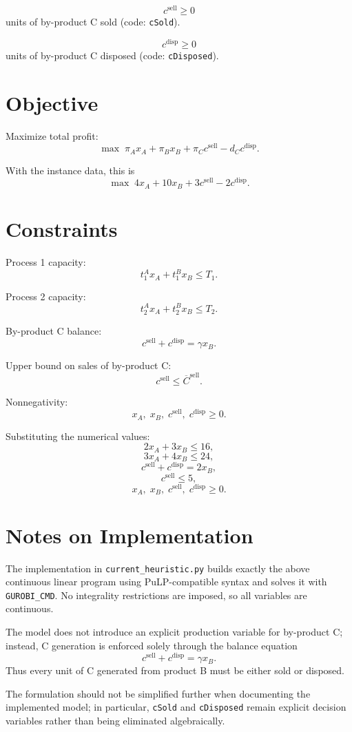 \[
c^{\mathrm{sell}} \ge 0
\]
units of by-product C sold (code: \texttt{cSold}).

\[
c^{\mathrm{disp}} \ge 0
\]
units of by-product C disposed (code: \texttt{cDisposed}).

\section*{Objective}

Maximize total profit:
\[
\max \;
\pi_A x_A + \pi_B x_B + \pi_C c^{\mathrm{sell}} - d_C c^{\mathrm{disp}}.
\]

With the instance data, this is
\[
\max \; 4x_A + 10x_B + 3c^{\mathrm{sell}} - 2c^{\mathrm{disp}}.
\]

\section*{Constraints}

Process 1 capacity:
\[
t^{A}_{1}x_A + t^{B}_{1}x_B \le T_1.
\]

Process 2 capacity:
\[
t^{A}_{2}x_A + t^{B}_{2}x_B \le T_2.
\]

By-product C balance:
\[
c^{\mathrm{sell}} + c^{\mathrm{disp}} = \gamma x_B.
\]

Upper bound on sales of by-product C:
\[
c^{\mathrm{sell}} \le \overline{C}^{\mathrm{sell}}.
\]

Nonnegativity:
\[
x_A,\;x_B,\;c^{\mathrm{sell}},\;c^{\mathrm{disp}} \ge 0.
\]

Substituting the numerical values:
\[
2x_A + 3x_B \le 16,
\]
\[
3x_A + 4x_B \le 24,
\]
\[
c^{\mathrm{sell}} + c^{\mathrm{disp}} = 2x_B,
\]
\[
c^{\mathrm{sell}} \le 5,
\]
\[
x_A,\;x_B,\;c^{\mathrm{sell}},\;c^{\mathrm{disp}} \ge 0.
\]

\section*{Notes on Implementation}

The implementation in \texttt{current\_heuristic.py} builds exactly the above continuous linear program using PuLP-compatible syntax and solves it with \texttt{GUROBI\_CMD}. No integrality restrictions are imposed, so all variables are continuous.

The model does not introduce an explicit production variable for by-product C; instead, C generation is enforced solely through the balance equation
\[
c^{\mathrm{sell}} + c^{\mathrm{disp}} = \gamma x_B.
\]
Thus every unit of C generated from product B must be either sold or disposed.

The formulation should not be simplified further when documenting the implemented model; in particular, \texttt{cSold} and \texttt{cDisposed} remain explicit decision variables rather than being eliminated algebraically.
